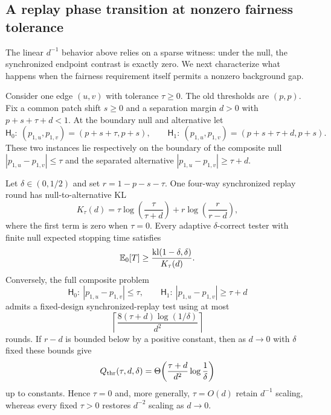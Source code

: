 \subsection{A replay phase transition at nonzero fairness tolerance}
\label{sec:threshold-replay}

The linear $d^{-1}$ behavior above relies on a sparse witness: under the null,
the synchronized endpoint contrast is exactly zero.  We next characterize what
happens when the fairness requirement itself permits a nonzero background gap.

Consider one edge $(u,v)$ with tolerance $\tau\ge0$.  The old thresholds are
$(p,p)$.  Fix a common patch shift $s\ge0$ and a separation margin $d>0$ with
$p+s+\tau+d<1$.  At the boundary null and alternative let
\[
\mathsf H_0:\ (p_{1,u},p_{1,v})=(p+s+\tau,p+s),
\qquad
\mathsf H_1:\ (p_{1,u},p_{1,v})=(p+s+\tau+d,p+s).
\]
These two instances lie respectively on the boundary of the composite null
$|p_{1,u}-p_{1,v}|\le\tau$ and the separated alternative
$|p_{1,u}-p_{1,v}|\ge\tau+d$.

\begin{theorem}
\label{thm:threshold-replay-phase}
Let $\delta\in(0,1/2)$ and set $r=1-p-s-\tau$.  One four-way synchronized
replay round has null-to-alternative KL
\[
K_\tau(d)
=
\tau\log\!\left(\frac{\tau}{\tau+d}\right)
+
r\log\!\left(\frac{r}{r-d}\right),
\]
where the first term is zero when $\tau=0$.  Every adaptive
$\delta$-correct tester with finite null expected stopping time satisfies
\[
\mathbb{E}_0[T]\ge
\frac{\mathrm{kl}(1-\delta,\delta)}{K_\tau(d)}.
\]
Conversely, the full composite problem
\[
\mathsf H_0:\ |p_{1,u}-p_{1,v}|\le\tau,
\qquad
\mathsf H_1:\ |p_{1,u}-p_{1,v}|\ge\tau+d
\]
admits a fixed-design synchronized-replay test using at most
\[
\left\lceil
\frac{8(\tau+d)\log(1/\delta)}{d^2}
\right\rceil
\]
rounds.  If $r-d$ is bounded below by a positive constant, then as $d\to0$
with $\delta$ fixed these bounds give
\[
Q_{\rm thr}(\tau,d,\delta)
=
\Theta\!\left(
\frac{\tau+d}{d^2}\log\frac1\delta
\right)
\]
up to constants.  Hence $\tau=0$ and, more generally, $\tau=O(d)$ retain
$d^{-1}$ scaling, whereas every fixed $\tau>0$ restores $d^{-2}$ scaling as
$d\to0$.
\end{theorem}

